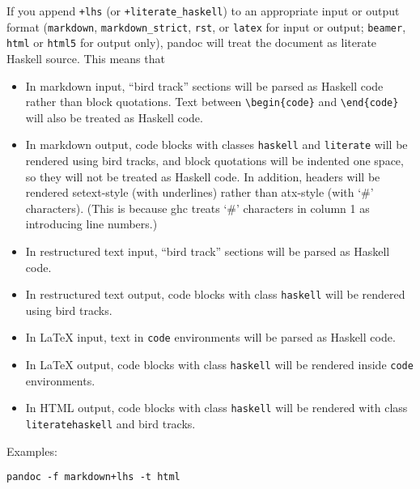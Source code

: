 \documentclass[]{article}
\begin{document}

If you append \texttt{+lhs} (or \texttt{+literate\_haskell}) to an
appropriate input or output format (\texttt{markdown},
\texttt{markdown\_strict}, \texttt{rst}, or \texttt{latex} for input or
output; \texttt{beamer}, \texttt{html} or \texttt{html5} for output
only), pandoc will treat the document as literate Haskell source. This
means that

\begin{itemize}
\item
  In markdown input, ``bird track'' sections will be parsed as Haskell
  code rather than block quotations. Text between
  \texttt{\textbackslash{}begin\{code\}} and
  \texttt{\textbackslash{}end\{code\}} will also be treated as Haskell
  code.
\item
  In markdown output, code blocks with classes \texttt{haskell} and
  \texttt{literate} will be rendered using bird tracks, and block
  quotations will be indented one space, so they will not be treated as
  Haskell code. In addition, headers will be rendered setext-style (with
  underlines) rather than atx-style (with `\#' characters). (This is
  because ghc treats `\#' characters in column 1 as introducing line
  numbers.)
\item
  In restructured text input, ``bird track'' sections will be parsed as
  Haskell code.
\item
  In restructured text output, code blocks with class \texttt{haskell}
  will be rendered using bird tracks.
\item
  In LaTeX input, text in \texttt{code} environments will be parsed as
  Haskell code.
\item
  In LaTeX output, code blocks with class \texttt{haskell} will be
  rendered inside \texttt{code} environments.
\item
  In HTML output, code blocks with class \texttt{haskell} will be
  rendered with class \texttt{literatehaskell} and bird tracks.
\end{itemize}

Examples:

\begin{verbatim}
pandoc -f markdown+lhs -t html
\end{verbatim}
\end{document}
